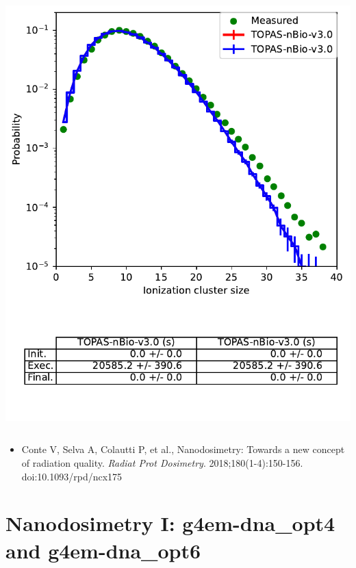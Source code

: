 \documentclass[aspectratio=1610]{beamer}
\begin{document}
\begin{frame}{\secname}
\begin{columns}
\begin{column}{0.4\linewidth}
     \includegraphics[width=\textwidth]{./NanodosimetryI/IDDistribution_opt2}
    \end{column}
   \end{columns}
\begin{itemize}
\item \tiny{Conte V, Selva A, Colautti P, et al., Nanodosimetry: Towards a new concept of radiation quality. \textit{Radiat Prot Dosimetry}. 2018;180(1-4):150-156. doi:10.1093/rpd/ncx175}
\end{itemize}
\end{frame}

\section{Nanodosimetry I: g4em-dna\_opt4 and g4em-dna\_opt6}
\end{document}
